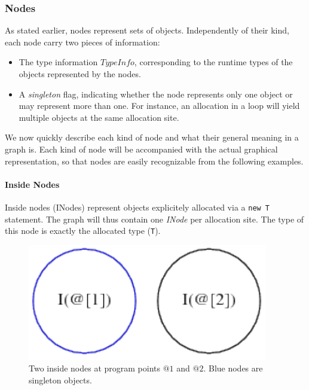 \subsubsection{Nodes}
As stated earlier, nodes represent sets of objects. Independently of their
kind, each node carry two pieces of information:
\begin{itemize}
    \item The type information $TypeInfo$, corresponding to the runtime types
    of the objects represented by the nodes.
    \item A \emph{singleton} flag, indicating whether the node represents only
    one object or may represent more than one. For instance, an allocation in a
    loop will yield multiple objects at the same allocation site.
\end{itemize}
We now quickly describe each kind of node and what their general meaning in a
graph is. Each kind of node will be accompanied with the actual graphical
representation, so that nodes are easily recognizable from the following
examples.

\paragraph{Inside Nodes}
Inside nodes (INodes) represent objects explicitely allocated via a \verb=new T=
statement. The graph will thus contain one \emph{INode} per allocation site.
The type of this node is exactly the allocated type (\verb=T=).
\begin{figure}[h]
    \centering

    \includegraphics{images/pt_inodes}

    \caption{Two inside nodes at program points $@1$ and $@2$. Blue nodes are
    singleton objects.}
    \label{fig:pt:inodes}
\end{figure}

